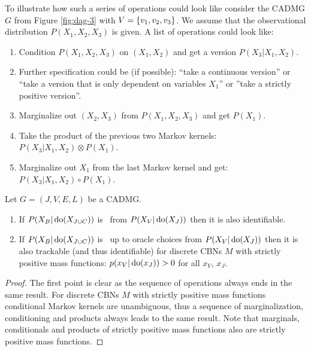 \begin{Eg}
    To illustrate how such a series of operations could look like
    consider the CADMG $G$ from Figure \ref{fig:dag-3} with $V=\left \{ v_1,v_2,v_3 \right \}$. 
    We assume that the observational distribution $P(X_1,X_2,X_3)$ is given.
    A list of operations could look like:
    \begin{enumerate}
        \item Condition $P(X_1,X_2,X_3)$ on $(X_1,X_2)$ and get a version $P(X_3|X_1,X_2)$. 
        \item[] Further specification could be (if possible): ``take a continuous version'' or ``take a version that is only dependent on variables $X_1$'' or ''take a strictly positive version''.
        \item Marginalize out $(X_2,X_3)$ from $P(X_1,X_2,X_3)$ and get $P(X_1)$.
        \item Take the product of the previous two Markov kernels: $P(X_3|X_1,X_2) \otimes P(X_1)$.
        \item Marginalize out $X_1$ from the last Markov kernel and get: $P(X_3|X_1,X_2) \circ P(X_1)$.
    \end{enumerate}
\end{Eg}

\begin{Lem}
    Let $G=(J,V,E,L)$ be a CADMG.
    \begin{enumerate} 
        \item If $P(X_B|\operatorname{do}(X_{J \cup C}))$ is \trackable\ from $P(X_V|\operatorname{do}(X_J))$ then it is also identifiable.
        \item If $P(X_B|\operatorname{do}(X_{J \cup C}))$ is \trackable\ up to oracle choices from $P(X_V|\operatorname{do}(X_J))$ 
            then it is also trackable (and thus identifiable) for discrete CBNs $M$ with strictly positive mass functions: 
    $p(x_V|\operatorname{do}(x_J))>0$ for all $x_V$, $x_J$.
    \end{enumerate}
    \begin{proof}
        The first point is clear as the sequence of operations always ends in the same result.
        For discrete CBNs $M$ with strictly positive mass functions conditional Markov kernels are unambiguous, thus a sequence
        of marginalization, conditioning and products always leads to the same result.
        Note that marginals, conditionals and products of strictly positive mass functions also are strictly positive mass functions.
    \end{proof}
\end{Lem}




